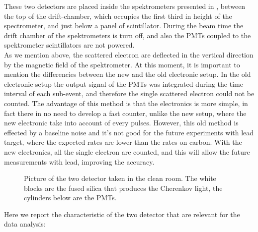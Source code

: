 These  two detectors are placed inside the spektrometers presented in , between the top of the drift-chamber, which occupies the first third in height of the spectrometer, and just below a panel of scintillator. During the beam time the drift chamber of the spektrometers is turn off, and also the PMTs coupled to the spektrometer scintillators are not powered.\\
As we mention above, the scattered electron are deflected in the vertical direction by the magnetic field of the spektrometer. 
At this moment, it is important to mention the differencies between the new and the old electronic setup. In the old electronic setup the output signal of the PMTs was integrated during the time interval of each sub-event, and therefore the single scattered electron could not be counted. The advantage of this method is that the electronics is more simple, in fact there in no need to develop a fast counter, unlike the new setup, where the new electronic take into account of every pulses. However, this old method is effected by a baseline noise and it's not good for the future experiments with lead target, where the expected rates are lower than the rates on carbon.
With the new electronics, all the single electron are counted, and this will allow the future measurements with lead, improving the accuracy. 

\begin{figure}[hbtp]
\centering
{} \quad
{} \quad
	\label{fig:Detectors}
\caption{Picture of the two detector taken in the clean room. The white blocks are the fused silica that produces the Cherenkov light, the cylinders below are the PMTs.}
\end{figure}

Here we report the characteristic of the two detector that are relevant for the data analysis: 

